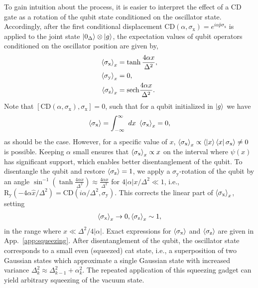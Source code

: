 \documentclass[aps,prx,showpacs,notitlepage,twocolumn,superscriptaddress,nofootinbib,preprintnumbers,floatfix,10pt, longbibliography]{revtex4-2}
\begin{document}
To gain intuition about the process, it is easier to interpret the effect of a CD gate as a rotation of the qubit state conditioned on the oscillator state. Accordingly, after the first conditional displacement $\mathrm{CD}(\alpha,\sigma_\mathrm{x})=e^{i\alpha\hat p\sigma_\mathrm{x}}$ is applied to the joint state $\ket{0_\Delta}\otimes\ket{g}$, the expectation values of qubit operators conditioned on the oscillator position are given by,
\begin{align}
 \braket{\sigma_\textrm{x}}_x&=\tanh{\frac{4\alpha x}{\Delta^2}},\\
 \braket{\sigma_\textrm{y}}_x&=0,\\
 \braket{\sigma_\textrm{z}}_x&=\mathrm{sech}{\frac{4 \alpha x}{\Delta^2} }.
\end{align}
Note that $[\mathrm{CD}(\alpha,\sigma_\mathrm{x}),\sigma_\mathrm{x}] = 0$, such that for a qubit initialized in $\ket{g}$ we have
\begin{align}
\braket{\sigma_\mathrm{x}} = \int_{-\infty}^\infty \ dx \ \braket{\sigma_\mathrm{x}}_x=0,
\end{align} 
as should be the case. However, for a specific value of $x$, $\braket{\sigma_\mathrm{x}}_x \propto \braket{\ket{x}\bra{x}\sigma_\mathrm{x}}\neq 0$ is possible. Keeping $\alpha$ small ensures that $\braket{\sigma_\mathrm{x}}_x \propto x$ on the interval where $\psi(x)$ has significant support, which enables better disentanglement of the qubit. To disentangle the qubit and restore $\braket{\sigma_\mathrm{z}} = 1$, we apply a $\sigma_\mathrm{y}$-rotation of the qubit by an angle $\sin^{-1}(\tanh{\frac{4\alpha x}{\Delta^2}}) \approx \frac{4\alpha x}{\Delta^2}$ for $4|\alpha|x/\Delta^2 \ll 1$, i.e., $\mathrm{R}_\mathrm{y}(-4\alpha \hat{x}/\Delta^2)=\mathrm{CD}(i\alpha/\Delta^2, \sigma_\mathrm{y})$. This corrects the linear part of $\braket{\sigma_\textrm{x}}_x$, setting
\begin{align}
\braket{\sigma_\textrm{x}}_x\rightarrow 0,\braket{\sigma_\textrm{z}}_x\sim 1,
\end{align}
in the range where $x\ll \Delta^2/4|\alpha|$. Exact expressions for $\braket{\sigma_\textrm{x}}$ and $\braket{\sigma_\textrm{z}}$ are given in App.~\ref{app:squeezing}. After disentanglement of the qubit, the oscillator state corresponds to a small even (squeezed) cat state, i.e., a superposition of two Gaussian states which approximate a single Gaussian state with increased variance $\Delta_k^2 \approx \Delta_{k-1}^2+\alpha_k^2$. The repeated application of this squeezing gadget can yield arbitrary squeezing of the vacuum state.
 
\end{document}
